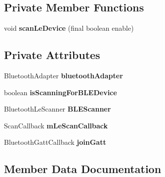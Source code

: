 \subsection*{Private Member Functions}
\begin{DoxyCompactItemize}
\item 
\hypertarget{classbaugen_1_1scoreboard_1_1frontpage_a60e83ffadfeaa895f9a35c81b2cb3717}{}\label{classbaugen_1_1scoreboard_1_1frontpage_a60e83ffadfeaa895f9a35c81b2cb3717} 
void {\bfseries scan\+Le\+Device} (final boolean enable)
\end{DoxyCompactItemize}
\subsection*{Private Attributes}
\begin{DoxyCompactItemize}
\item 
\hypertarget{classbaugen_1_1scoreboard_1_1frontpage_a8a25466ea5fcaaf03aa6f3de5e5405ec}{}\label{classbaugen_1_1scoreboard_1_1frontpage_a8a25466ea5fcaaf03aa6f3de5e5405ec} 
Bluetooth\+Adapter {\bfseries bluetooth\+Adapter}
\item 
\hypertarget{classbaugen_1_1scoreboard_1_1frontpage_ab64ac5bd2598b8778810f4e1af544a1d}{}\label{classbaugen_1_1scoreboard_1_1frontpage_ab64ac5bd2598b8778810f4e1af544a1d} 
boolean {\bfseries is\+Scanning\+For\+B\+L\+E\+Device}
\item 
\hypertarget{classbaugen_1_1scoreboard_1_1frontpage_a1d9dc0b9537be5fd7e57585507418048}{}\label{classbaugen_1_1scoreboard_1_1frontpage_a1d9dc0b9537be5fd7e57585507418048} 
Bluetooth\+Le\+Scanner {\bfseries B\+L\+E\+Scanner}
\item 
Scan\+Callback {\bfseries m\+Le\+Scan\+Callback}
\item 
\hypertarget{classbaugen_1_1scoreboard_1_1frontpage_a7a3c692738750172951f2ece5561a75f}{}\label{classbaugen_1_1scoreboard_1_1frontpage_a7a3c692738750172951f2ece5561a75f} 
Bluetooth\+Gatt\+Callback {\bfseries join\+Gatt}
\end{DoxyCompactItemize}


\subsection{Member Data Documentation}
\hypertarget{classbaugen_1_1scoreboard_1_1frontpage_af2743634355793d2d6d268a8e1126b03}{}\label{classbaugen_1_1scoreboard_1_1frontpage_af2743634355793d2d6d268a8e1126b03} 
